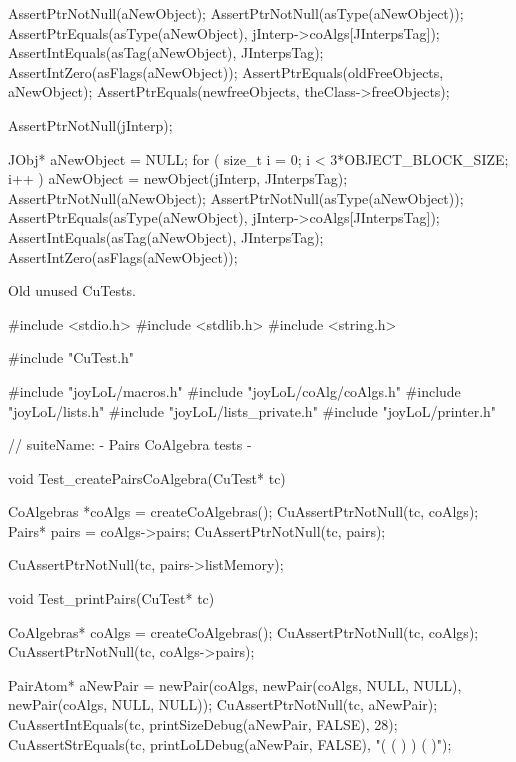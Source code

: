   AssertPtrNotNull(aNewObject);
  AssertPtrNotNull(asType(aNewObject));
  AssertPtrEquals(asType(aNewObject), jInterp->coAlgs[JInterpsTag]);
  AssertIntEquals(asTag(aNewObject), JInterpsTag);
  AssertIntZero(asFlags(aNewObject));
  AssertPtrEquals(oldFreeObjects, aNewObject);
  AssertPtrEquals(newfreeObjects, theClass->freeObjects);
\stopCTest
\stopTestCase


\startCTest
  AssertPtrNotNull(jInterp);

  JObj* aNewObject = NULL;
  for ( size_t i = 0; i < 3*OBJECT_BLOCK_SIZE; i++ ) {
    aNewObject = newObject(jInterp, JInterpsTag);
  }
  AssertPtrNotNull(aNewObject);
  AssertPtrNotNull(asType(aNewObject));
  AssertPtrEquals(asType(aNewObject), jInterp->coAlgs[JInterpsTag]);
  AssertIntEquals(asTag(aNewObject), JInterpsTag);
  AssertIntZero(asFlags(aNewObject));
\stopCTest
\stopTestCase
\stopTestSuite

Old unused CuTests.

\starttyping
#include <stdio.h>
#include <stdlib.h>
#include <string.h>

#include "CuTest.h"

#include "joyLoL/macros.h"
#include "joyLoL/coAlg/coAlgs.h"
#include "joyLoL/lists.h"
#include "joyLoL/lists_private.h"
#include "joyLoL/printer.h"

// suiteName: - Pairs CoAlgebra tests -

void Test_createPairsCoAlgebra(CuTest* tc) {
  CoAlgebras *coAlgs = createCoAlgebras();
  CuAssertPtrNotNull(tc, coAlgs);
  Pairs* pairs = coAlgs->pairs;
  CuAssertPtrNotNull(tc, pairs);

  CuAssertPtrNotNull(tc, pairs->listMemory);
}

void Test_printPairs(CuTest* tc) {
  CoAlgebras* coAlgs = createCoAlgebras();
  CuAssertPtrNotNull(tc, coAlgs);
  CuAssertPtrNotNull(tc, coAlgs->pairs);

  PairAtom* aNewPair = newPair(coAlgs,
                               newPair(coAlgs, NULL, NULL),
                               newPair(coAlgs, NULL, NULL));
  CuAssertPtrNotNull(tc, aNewPair);
  CuAssertIntEquals(tc, printSizeDebug(aNewPair, FALSE), 28);
  CuAssertStrEquals(tc, printLoLDebug(aNewPair, FALSE), "( ( ) ) ( )");
}
\stoptyping
